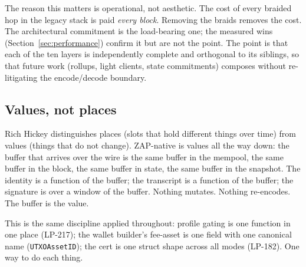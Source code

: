 The reason this matters is operational, not aesthetic. The cost of
every braided hop in the legacy stack is paid \emph{every block}.
Removing the braids removes the cost. The architectural commitment is
the load-bearing one; the measured wins (Section~\ref{sec:performance})
confirm it but are not the point. The point is that each of the ten
layers is independently complete and orthogonal to its siblings, so
that future work (rollups, light clients, state commitments) composes
without re-litigating the encode/decode boundary.

\subsection{Values, not places}

Rich Hickey distinguishes places (slots that hold different things
over time) from values (things that do not change). ZAP-native is
values all the way down: the buffer that arrives over the wire is the
same buffer in the mempool, the same buffer in the block, the same
buffer in state, the same buffer in the snapshot. The identity is a
function of the buffer; the transcript is a function of the buffer;
the signature is over a window of the buffer. Nothing mutates.
Nothing re-encodes. The buffer is the value.

This is the same discipline applied throughout: profile gating is one
function in one place (LP-217); the wallet builder's fee-asset is one
field with one canonical name (\texttt{UTXOAssetID}); the cert is one
struct shape across all modes (LP-182). One way to do each thing.
